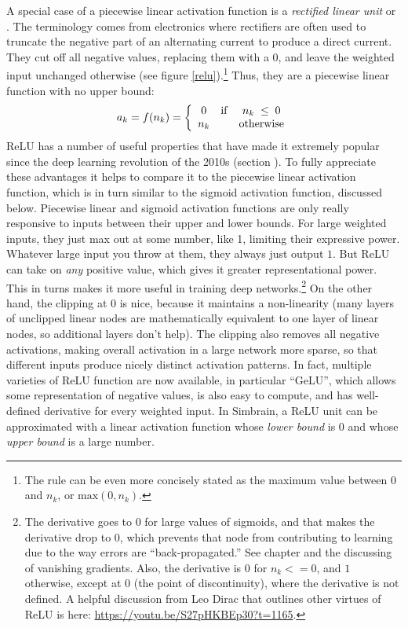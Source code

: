 A special case of a piecewise linear activation function is a \emph{rectified linear unit} or . The terminology comes from electronics where rectifiers are often used to truncate the negative part of an alternating current to produce a direct current. They cut off all negative values, replacing them with a 0, and leave the weighted input unchanged otherwise (see figure \ref{relu}).\footnote{The rule can be even more concisely stated as the maximum value between 0 and $n_k$, or $\mbox{max}(0,n_k)$.} Thus, they are a piecewise linear function with no upper bound:
\begin{eqnarray*}
a_k = f(n_k) =  
\left\{
      \begin{array}{clc}
                  0      & {\rm if} &   n_k\; \leq \; 0          \\  
              n_k  &  &  \mbox{otherwise}	
      \end{array} 
\right.
\end{eqnarray*}
ReLU has a number of useful properties that have made it extremely popular since the deep learning revolution of the 2010s (section ). To fully appreciate these advantages it helps to compare it to the piecewise linear activation function, which is in turn similar to the sigmoid activation function, discussed below. Piecewise linear and sigmoid activation functions are only really responsive to inputs between their upper and lower bounds. For large weighted inputs, they just max out at some number, like 1, limiting their expressive power. Whatever large input you throw at them, they always just output $1$. But ReLU can take on \emph{any} positive value, which gives it greater representational power. This in turns makes it more useful in training deep networks.\footnote{The derivative goes to 0 for large values of sigmoids, and that makes the derivative drop to  0, which prevents that node from contributing to learning due to the way errors are ``back-propagated.''  See chapter  and the discussing of vanishing gradients. Also, the derivative is $0$ for $n_k <= 0$, and $1$ otherwise, except at $0$ (the point of discontinuity), where the derivative is not defined.  A helpful discussion from Leo Dirac that outlines other virtues of ReLU is here: \url{https://youtu.be/S27pHKBEp30?t=1165}. }  On the other hand, the clipping at $0$ is nice, because it maintains a non-linearity (many layers of unclipped linear nodes are mathematically equivalent to one layer of linear nodes, so additional layers don't help). The clipping also removes all negative activations, making overall activation in a large network more sparse, so that different inputs produce nicely distinct activation patterns. In fact, multiple varieties of ReLU function are now available, in particular ``GeLU'', which allows some representation of negative values, is also easy to compute, and has well-defined derivative for every weighted input.  In Simbrain, a ReLU unit can be approximated with a linear activation function whose \emph{lower bound} is 0 and whose \emph{upper bound} is a large number.

